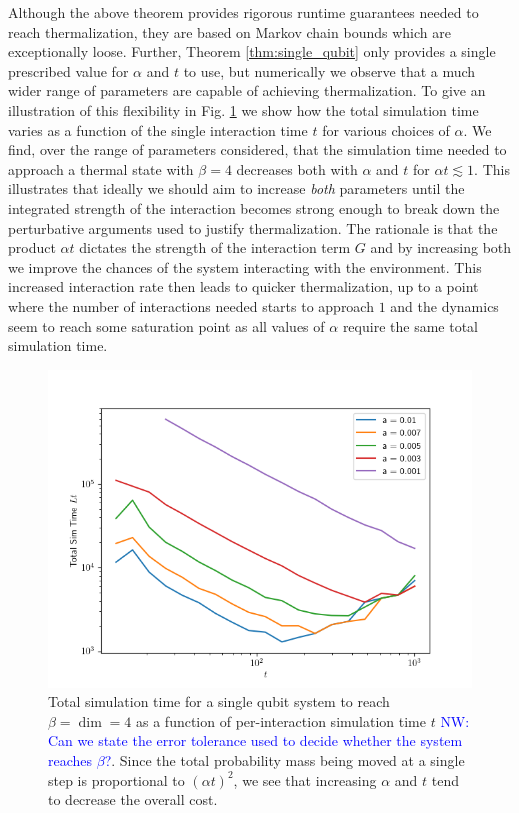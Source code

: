 \documentclass{article}
\begin{document}
 Although the above theorem provides rigorous runtime guarantees needed to reach thermalization, they are based on Markov chain bounds which are exceptionally loose. %
 Further, Theorem \ref{thm:single_qubit} only provides a single prescribed value for $\alpha$ and $t$ to use, but numerically we observe that a much wider range of parameters are capable of achieving thermalization. To give an illustration of this flexibility in Fig. \ref{fig:tot_time_vs_single_time} we show how the total simulation time varies as a function of the single interaction time $t$ for various choices of $\alpha$. We find, over the range of parameters considered, that the simulation time needed to approach a thermal state with $\beta=4$  decreases both with $\alpha$ and $t$ for $\alpha t\lesssim 1$.  This illustrates that ideally we  should aim to increase \emph{both} parameters until the integrated strength of the interaction becomes strong enough to break down the perturbative arguments used to justify thermalization. The rationale is that the product $\alpha t$ dictates the strength of the interaction term $G$ and by increasing both we improve the chances of the system interacting with the environment. This increased interaction rate then leads to quicker thermalization, up to a point where the number of interactions needed starts to approach $1$ and the dynamics seem to reach some saturation point as all values of $\alpha$ require the same total simulation time.


\begin{figure} 
    \centering
    \includegraphics[width=0.75\linewidth]{numerics/data/total_time_vs_time.png}
    \caption{Total simulation time for a single qubit system to reach $\beta = \dim = 4$ as a function of per-interaction simulation time $t$ \textcolor{blue}{NW: Can we state the error tolerance used to decide whether the system reaches $\beta$?}. Since the total probability mass being moved at a single step is proportional to $(\alpha t)^2$, we see that increasing $\alpha$ and $t$ tend to decrease the overall cost.}\label{fig:tot_time_vs_single_time}
\end{figure}
\end{document}

